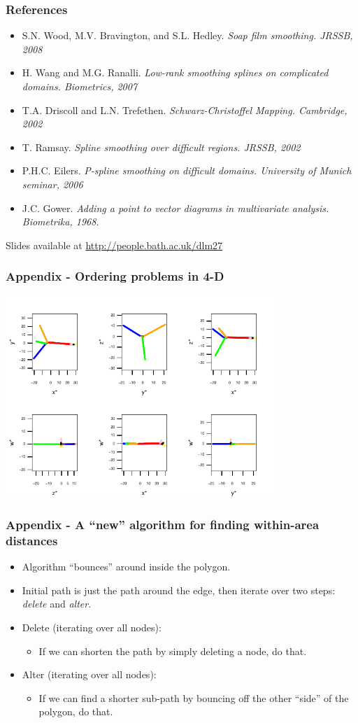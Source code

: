 \documentclass[ignorenonframetext]{beamer} %
\newcommand{\bi}{\begin{itemize}}
\newcommand{\ei}{\end{itemize}}
\begin{document}
\begin{frame}
	\frametitle{References}
       \bi
         \item S.N. Wood, M.V. Bravington, and S.L. Hedley. \emph{Soap film smoothing. JRSSB, 2008}
         \item H. Wang and M.G. Ranalli. \emph{Low-rank smoothing splines on complicated domains. Biometrics, 2007}
         \item T.A. Driscoll and L.N. Trefethen. \emph{Schwarz-Christoffel Mapping. Cambridge, 2002}
         \item T. Ramsay. \emph{Spline smoothing over difficult regions. JRSSB, 2002}
         \item P.H.C. Eilers. \emph{P-spline smoothing on difficult domains. University of Munich seminar, 2006}
	\item J.C. Gower. \emph{Adding a point to vector diagrams in multivariate analysis. Biometrika, 1968.}
        \ei
        Slides available at \url{http://people.bath.ac.uk/dlm27}
\end{frame}

\begin{frame}
	\frametitle{Appendix - Ordering problems in 4-D}
	\centering
            \includegraphics[height=3in]{figs/comb-4d.pdf}	
\end{frame}

\begin{frame}
	\frametitle{Appendix - A ``new'' algorithm for finding within-area distances}
	\bi
		\item Algorithm ``bounces'' around inside the polygon.
		\item Initial path is just the path around the edge, then iterate over two steps: \textit{delete} and \textit{alter}.
		\item Delete (iterating over all nodes):
			\bi \item If we can shorten the path by simply deleting a node, do that.
			\ei
		\item Alter (iterating over all nodes):
			\bi \item If we can find a shorter sub-path by bouncing off the other ``side'' of the polygon, do that.
			\ei
	\ei
\end{frame}
\end{document}
